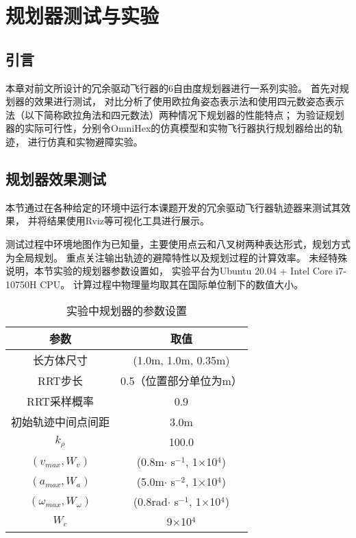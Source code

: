 
\chapter{规划器测试与实验}\label{chap:experiments}

\section{引言}\label{sec:intro_5}
本章对前文所设计的冗余驱动飞行器的6自由度规划器进行一系列实验。
首先对规划器的效果进行测试，
对比分析了使用欧拉角姿态表示法和使用四元数姿态表示法（以下简称欧拉角法和四元数法）两种情况下规划器的性能特点；
为验证规划器的实际可行性，分别令OmniHex的仿真模型和实物飞行器执行规划器给出的轨迹，
进行仿真和实物避障实验。

\section{规划器效果测试}\label{sec:planner_performance}
本节通过在各种给定的环境中运行本课题开发的冗余驱动飞行器轨迹器来测试其效果，
并将结果使用Rviz\cite{kam2015rviz}等可视化工具进行展示。

测试过程中环境地图作为已知量，主要使用点云和八叉树两种表达形式，规划方式为全局规划。
重点关注输出轨迹的避障特性以及规划过程的计算效率。
未经特殊说明，本节实验的规划器参数设置如，
实验平台为Ubuntu 20.04 + Intel Core i7-10750H CPU。
计算过程中物理量均取其在国际单位制下的数值大小。

\begin{table}[htbp]
    \caption{实验中规划器的参数设置\label{tab:planner_parameter_setting}}
    \vspace{0.5em}\centering\wuhao
    \begin{tabular}{cc}
    \toprule[1.5pt]
    参数 & 取值\\
    \midrule[0.2pt]
    长方体尺寸 & (1.0m, 1.0m, 0.35m) \\
    RRT步长 & 0.5（位置部分单位为m） \\ 
    RRT采样概率 & 0.9 \\
    初始轨迹中间点间距 & 3.0m \\
    $k_\rho$ & 100.0 \\
    $(v_{max}, W_v)$ & (0.8m$\cdot$ s$^{-1}$, 1$\times$10$^{4}$) \\
    $(a_{max}, W_a)$ & (5.0m$\cdot$ s$^{-2}$, 1$\times$10$^{4}$) \\
    $(\omega_{max}, W_\omega)$ & (0.8rad$\cdot$ s$^{-1}$, 1$\times$10$^{4}$) \\
    $W_c$ & 9$\times$10$^{4}$ \\
    \bottomrule[1.5pt]
    \end{tabular}
  \end{table}

